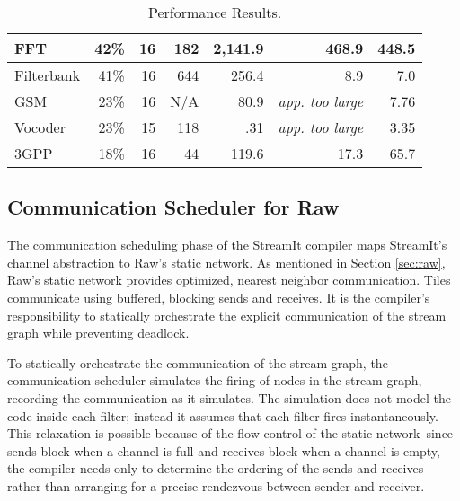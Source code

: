\begin{table*}[t]
\begin{center}
\begin{tabular}{|l||r|r|r|r||r||r||}
FFT    & 42\% & 16  & 182 &  2,141.9 & 468.9 & 448.5  \\ \hline
Filterbank & 
       41\% & 16  &  644 &   256.4  & 8.9 & 7.0   \\ \hline
GSM    & 23\% & 16 & N/A &    80.9  & {\it app. too large} & 7.76 \\ \hline
Vocoder& 23\% & 15  & 118 &     .31  & {\it app. too large} & 3.35  \\ \hline
3GPP   & 18\% & 16  & 44 &   119.6  & 17.3  & 65.7   \\ \hline \hline
\end{tabular}
\vspace{-6pt}
\caption{\protect\small Performance Results.}
\label{tab:performance}
\end{center}
\vspace{-12pt}
\end{table*}

\subsection{Communication Scheduler for Raw}
\label{sec:rawcommunic}

The communication scheduling phase of the StreamIt compiler maps
StreamIt's channel abstraction to Raw's static network.  As mentioned
in Section \ref{sec:raw}, Raw's static network provides optimized,
nearest neighbor communication.  Tiles communicate using buffered,
blocking sends and receives.  It is the compiler's responsibility to
statically orchestrate the explicit communication of the stream graph
while preventing deadlock.

To statically orchestrate the communication of the stream graph, the
communication scheduler simulates the firing of nodes in the stream
graph, recording the communication as it simulates.  The simulation
does not model the code inside each filter; instead it assumes that
each filter fires instantaneously.  This relaxation is possible
because of the flow control of the static network--since sends block
when a channel is full and receives block when a channel is empty, the
compiler needs only to determine the ordering of the sends and
receives rather than arranging for a precise rendezvous between sender
and receiver.

% 

